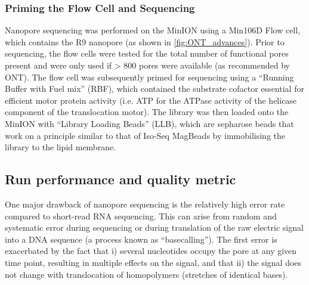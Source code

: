 \subsubsection{Priming the Flow Cell and Sequencing}
\label{sec: ONTlib_sequencing}
Nanopore sequencing was performed on the MinION using a Min106D Flow cell, which contains the R9 nanopore (as shown in \cref{fig:ONT_advances}). Prior to sequencing, the flow cells were tested for the total number of functional pores present and were only used if > 800 pores were available (as recommended by ONT). The flow cell was subsequently primed for sequencing using a “Running Buffer with Fuel mix” (RBF), which contained the substrate cofactor essential for efficient motor protein activity (i.e. ATP for the ATPase activity of the helicase component of the translocation motor). The library was then loaded onto the MinION with “Library Loading Beads” (LLB), which are sepharose beads that work on a principle similar to that of Iso-Seq MagBeads by immobilising the library to the lipid membrane.

\subsection{Run performance and quality metric}
\label{ONT_performance}
One major drawback of nanopore sequencing is the relatively high error rate compared to short-read RNA sequencing. This can arise from random and systematic error during sequencing or during translation of the raw electric signal into a DNA sequence (a process known as “basecalling”)\cite{Rang2018}. The first error is exacerbated by the fact that i) several nucleotides occupy the pore at any given time point, resulting in multiple effects on the signal, and that ii) the signal does not change with translocation of homopolymers (stretches of identical bases).

